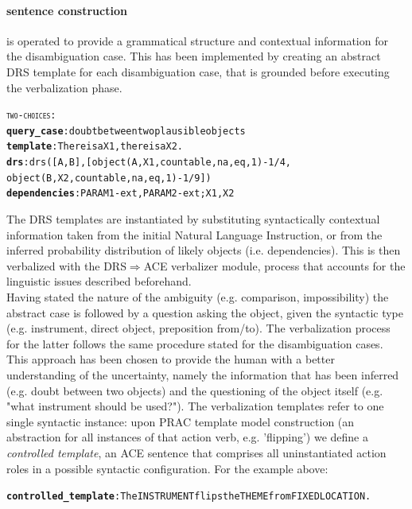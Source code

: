 \documentclass[oribibl]{llncs}
\begin{document}
\paragraph{sentence construction} is operated to provide a grammatical structure and contextual information for the disambiguation case. This has been implemented by creating an 
abstract DRS template for each disambiguation case, that is grounded 
before executing the verbalization phase. 
\begin{alltt}
{\large \textsc{two-choices}}:
    \textbf{query_case}: doubt between two plausible objects
    \textbf{template}: There is a X1, there is a X2.
    \textbf{drs}: drs([A,B],[object(A,X1,countable,na,eq,1)-1/4,
    object(B,X2,countable,na,eq,1)-1/9])
    \textbf{dependencies}: PARAM1-ext, PARAM2-ext; X1, X2
\end{alltt} 

The DRS templates are instantiated by substituting 
syntactically contextual information taken from the initial Natural 
Language Instruction, or from the inferred probability distribution 
of likely objects (i.e. dependencies). This is then verbalized with 
the DRS$\Rightarrow$ACE verbalizer module, process that accounts for 
the linguistic issues described beforehand.\\ Having stated the 
nature of the ambiguity (e.g. comparison, impossibility) the 
abstract case is followed by a question asking the object, 
given the syntactic type (e.g. instrument, direct object, 
preposition from/to). The verbalization process for the latter 
follows the same procedure stated for the disambiguation cases. \\ 
This approach has been chosen to provide the human with a better
 understanding of the uncertainty, namely the information that has
  been inferred (e.g. doubt between two objects) and the questioning 
  of the object itself (e.g. "what instrument should be used?"). 
  The verbalization templates refer to one single syntactic instance: upon PRAC template 
model construction (an abstraction for all instances of that action 
verb, e.g. 'flipping') we define a \textit{controlled template}, an 
ACE sentence that comprises all uninstantiated action roles in a 
possible syntactic configuration. For the example above: 

{\small 
\begin{alltt} \textbf{controlled_template}: The INSTRUMENT flips the THEME from FIXEDLOCATION. \end{alltt} }
\end{document}
